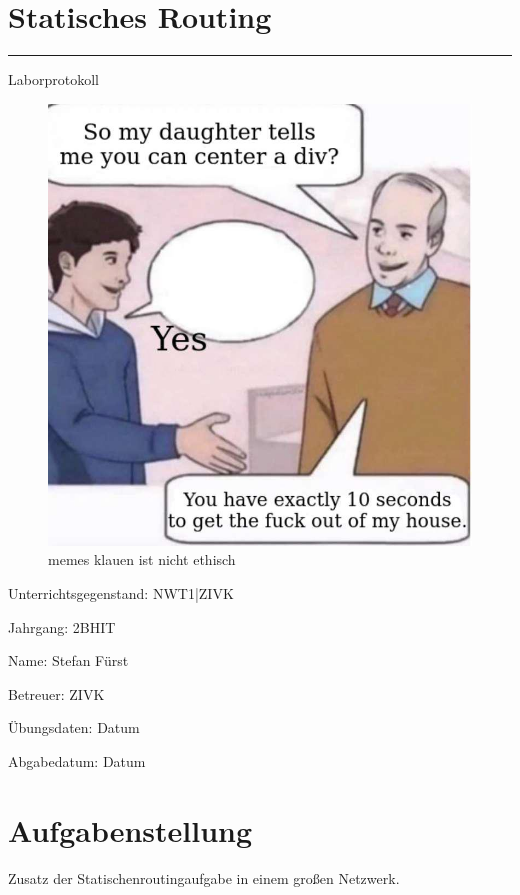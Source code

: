 \documentclass[a4paper]{article}
\begin{document}
\pagestyle{oida}
\section*{Statisches Routing}
\par\noindent\rule{\textwidth}{0.4pt}

Laborprotokoll

\begin{figure}[h]
\includegraphics[scale=0.6]{meme.jpeg}
\caption{memes klauen ist nicht ethisch}
\end{figure}

\vspace*{\fill}
Unterrichtsgegenstand:	NWT1|ZIVK

Jahrgang:	2BHIT

Name:	Stefan Fürst

Betreuer: 	ZIVK

Übungsdaten:	Datum

Abgabedatum:	Datum


\newpage
\tableofcontents

\newpage

\section{Aufgabenstellung}
Zusatz der Statischenroutingaufgabe in einem großen Netzwerk.
\end{document}

